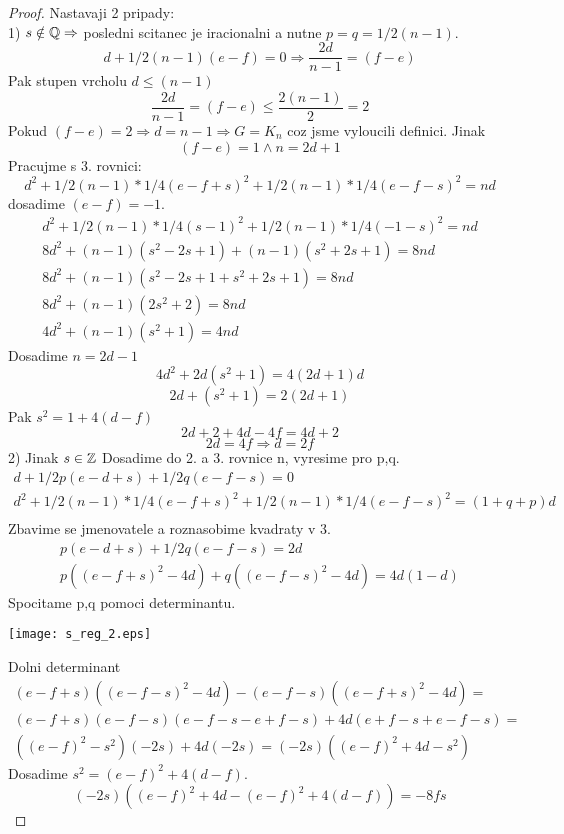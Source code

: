 \begin{proof}
	Nastavaji 2 pripady:\\
	1) $s \notin \operatorname{\mathbb{Q}} \Rightarrow$ posledni scitanec je iracionalni a nutne $ p = q = 1/2 (n - 1)$.
	\[ d + 1/2 (n-1) (e - f) = 0 \Rightarrow \frac{2d}{n - 1} = (f - e) \]
	Pak stupen vrcholu $ d \leq (n - 1)$
	\[ \frac{2d}{n - 1} = (f - e) \leq \frac{2 (n-1)}{2} = 2 \]
	Pokud $(f - e) = 2 \Rightarrow d = n-1 \Rightarrow G = K_n$ coz jsme vyloucili definici. Jinak
	\[(f - e) = 1 \land n = 2d + 1 \]
	Pracujme s 3. rovnici:
	\[ d^2 + 1/2 (n-1) * 1/4 (e - f + s)^2 + 1/2 (n-1) * 1/4 (e - f -s)^2 = nd \]
	dosadime $(e - f) = -1$.
	\begin{equation*}
	\begin{aligned}
	 d^2 + 1/2 (n-1) * 1/4 (s - 1)^2 + 1/2 (n-1) * 1/4 (-1 - s)^2 = nd \\
	 8d^2 + (n-1)(s^2 - 2s + 1) + (n-1)(s^2 + 2s + 1) = 8nd \\
	 8d^2 + (n-1)(s^2 - 2s + 1 + s^2 + 2s + 1) = 8nd \\
	 8d^2 + (n-1)(2s^2 + 2) = 8nd \\
	 4d^2 + (n-1)(s^2 + 1) = 4nd
	\end{aligned}
	\end{equation*}
	Dosadime $n = 2d - 1$
	\[ 4d^2 + 2d(s^2 + 1) = 4(2d + 1)d \]
	\[ 2d + (s^2 + 1) = 2(2d + 1) \]
	Pak $s^2 = 1 + 4(d - f)$
	\[ 2d + 2 + 4d - 4f = 4d + 2 \]
	\[ 2d = 4f \Rightarrow d = 2f \]
	2) Jinak $s \in \operatorname{\mathbb{Z}}$ Dosadime do 2. a 3. rovnice n, vyresime pro p,q.
	\begin{equation*}
	\begin{aligned}
		d + 1/2 p (e - d + s) + 1/2 q (e - f - s) = 0 \\
		d^2 + 1/2 (n-1) * 1/4 (e - f + s)^2 + 1/2 (n-1) * 1/4 (e - f -s)^2 = (1 + q + p)d \\
	\end{aligned}
	\end{equation*}
	Zbavime se jmenovatele a roznasobime kvadraty v 3.
	\begin{equation*}
	\begin{aligned}
		p (e - d + s) + 1/2 q (e - f - s) = 2d \\
		p((e - f + s)^2 - 4d) + q((e - f -s)^2 - 4d) = 4d (1 - d)
	\end{aligned}
	\end{equation*}
	Spocitame p,q pomoci determinantu.

	\texttt{[image: s\_reg\_2.eps]}

	Dolni determinant
	\begin{equation*}
	\begin{split}
		(e - f + s)((e - f - s)^2 -4d) - (e - f - s)((e - f + s)^2 - 4d) = \\
		(e - f + s)(e - f - s)(e - f -s - e + f - s) + 4d (e + f - s + e - f - s) = \\
		((e - f)^2 - s^2)(-2s) + 4d (-2s) = (-2s)((e - f)^2 + 4d - s^2)
	\end{split}
	\end{equation*}
	Dosadime $s^2 = (e - f)^2 + 4(d - f)$.
	\[ (-2s)((e - f)^2 + 4d - (e - f)^2 + 4(d - f)) = -8fs \]


\end{proof}
